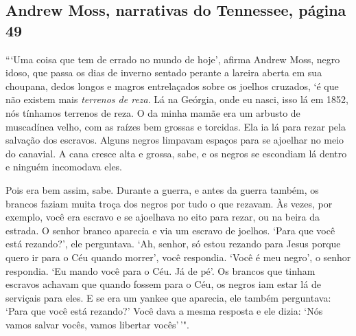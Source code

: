 \subsection{Andrew Moss, narrativas do Tennessee, página 49}
\label{ref202}

```Uma coisa que tem de errado no mundo de hoje', afirma Andrew Moss,
negro idoso, que passa os dias de inverno sentado perante a lareira
aberta em sua choupana, dedos longos e magros entrelaçados sobre os
joelhos cruzados, `é que não existem mais \emph{terrenos de reza}. Lá na
Geórgia, onde eu nasci, isso lá em 1852, nós tínhamos terrenos de reza.
O da minha mamãe era um arbusto de muscadínea velho, com as raízes bem
grossas e torcidas. Ela ia lá para rezar pela salvação dos escravos.
Alguns negros limpavam espaços para se ajoelhar no meio do canavial. A
cana cresce alta e grossa, sabe, e os negros se escondiam lá dentro e
ninguém incomodava eles.

Pois era bem assim, sabe. Durante a guerra, e antes da guerra também, os
brancos faziam muita troça dos negros por tudo o que rezavam. Às vezes,
por exemplo, você era escravo e se ajoelhava no eito para rezar, ou na
beira da estrada. O senhor branco aparecia e via um escravo de joelhos.
`Para que você está rezando?', ele perguntava. `Ah, senhor, só estou
rezando para Jesus porque quero ir para o Céu quando morrer', você
respondia. `Você é meu negro', o senhor respondia. `Eu mando você
para o Céu. Já de pé'. Os brancos que tinham escravos achavam que
quando fossem para o Céu, os negros iam estar lá de serviçais para eles.
E se era um yankee que aparecia, ele também perguntava: `Para que você
está rezando?' Você dava a mesma resposta e ele dizia: `Nós vamos
salvar vocês, vamos libertar vocês'\,'".

